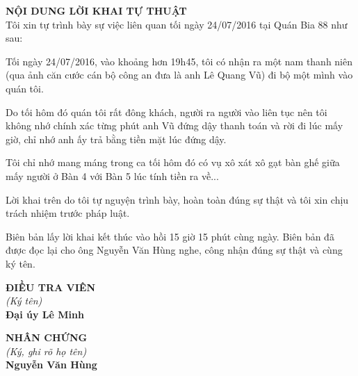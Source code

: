 \documentclass[12pt,a4paper]{article}
\begin{document}
\vspace{0.3cm}\noindent\textbf{\large NỘI DUNG LỜI KHAI TỰ THUẬT}\\[0.15cm]


Tôi xin tự trình bày sự việc liên quan tối ngày 24/07/2016 tại Quán Bia 88 như sau:


Tối ngày 24/07/2016, vào khoảng hơn 19h45, tôi có nhận ra một nam thanh niên (qua ảnh căn cước cán bộ công an đưa là anh Lê Quang Vũ) đi bộ một mình vào quán tôi.


Do tối hôm đó quán tôi rất đông khách, người ra người vào liên tục nên tôi không nhớ chính xác từng phút anh Vũ đứng dậy thanh toán và rời đi lúc mấy giờ, chỉ nhớ anh ấy trả bằng tiền mặt lúc đứng dậy.


Tôi chỉ nhớ mang máng trong ca tối hôm đó có vụ xô xát xô gạt bàn ghế giữa mấy người ở Bàn 4 với Bàn 5 lúc tính tiền ra về...


Lời khai trên do tôi tự nguyện trình bày, hoàn toàn đúng sự thật và tôi xin chịu trách nhiệm trước pháp luật.



Biên bản lấy lời khai kết thúc vào hồi 15 giờ 15 phút cùng ngày. Biên bản đã được đọc lại cho ông Nguyễn Văn Hùng nghe, công nhận đúng sự thật và cùng ký tên.

\vspace{0.8cm}
\noindent
\begin{minipage}[t]{0.48\textwidth}
    \begin{center}
        \textbf{ĐIỀU TRA VIÊN}\\[0.1cm]
        \textit{(Ký tên)}\\[1.6cm]
        \textbf{Đại úy Lê Minh}
    \end{center}
\end{minipage}
\hfill
\begin{minipage}[t]{0.48\textwidth}
    \begin{center}
        \textbf{NHÂN CHỨNG}\\[0.1cm]
        \textit{(Ký, ghi rõ họ tên)}\\[1.6cm]
        \textbf{Nguyễn Văn Hùng}
    \end{center}
\end{minipage}
\end{document}

